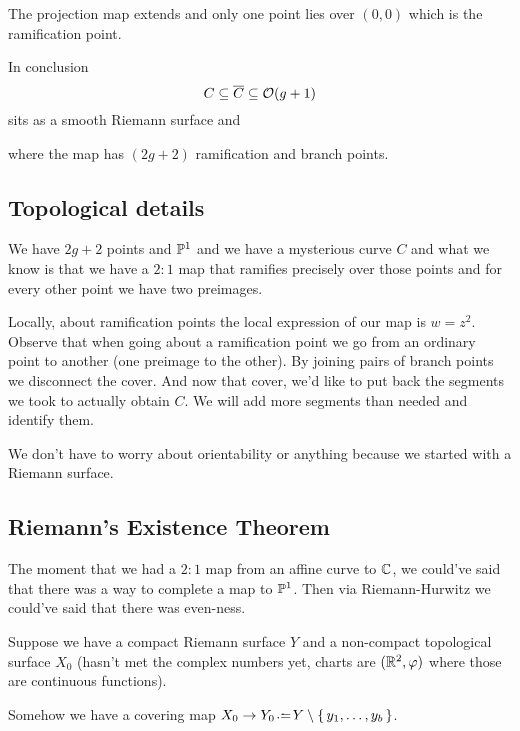 \documentclass[12pt]{memoir}
\begin{document}
The projection map extends and only one point lies over $(0,0)$ which is the ramification point.\par
In conclusion 
$$C\subseteq\overline C\subseteq\mathcal{O}(g+1)$$ 
sits as a smooth Riemann surface and 
\begin{center}
\end{center}
where the map has $(2g+2)$ ramification and branch points.

\subsection{Topological details}

We have $2g+2$ points and $\mathbb{P}^1$ and we have a mysterious curve $C$ and what we know is that we have a $2:1$ map that ramifies precisely over those points and for every other point we have two preimages.\par
Locally, about ramification points the local expression of our map is $w=z^2$. Observe that when going about a ramification point we go from an ordinary point to another (one preimage to the other). By joining pairs of branch points we disconnect the cover. And now that cover, we'd like to put back the segments we took to actually obtain $C$. We will add more segments than needed and identify them.\par
We don't have to worry about orientability or anything because we started with a Riemann surface. 

\subsection{Riemann's Existence Theorem}

The moment that we had a $2:1$ map from an affine curve to $\mathbb{C}$, we could've said that there was a way to complete a map to $\mathbb{P}^1$. Then via Riemann-Hurwitz we could've said that there was even-ness.\par
Suppose we have a compact Riemann surface $Y$ and a non-compact topological surface $X_0$ (hasn't met the complex numbers yet, charts are $(\mathbb{R}^2,\varphi)$ where those are continuous functions).\par
Somehow we have a covering map $X_0\to Y_0\defeq Y\less\set{y_1,\dots,y_b}$.
\end{document}
